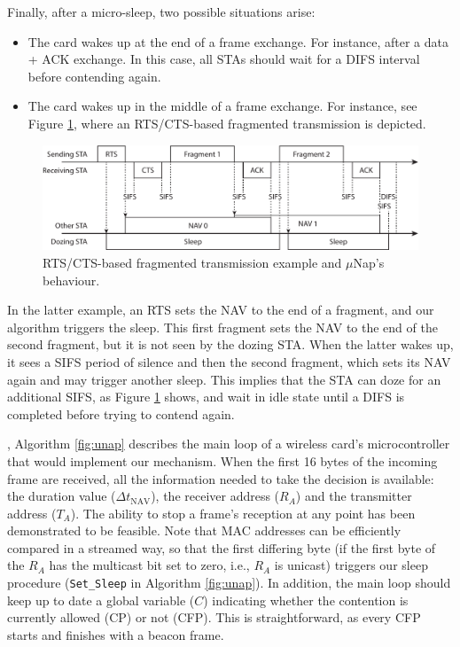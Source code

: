 \documentclass[twoside,nohyper]{tufte-book}
\providecommand{\tightlist}{%
  \setlength{\itemsep}{0pt}\setlength{\parskip}{0pt}}
\theoremstyle{definition}
\theoremstyle{definition}
\theoremstyle{definition}
\theoremstyle{remark}
\begin{document}
Finally, after a micro-sleep, two possible situations arise:

\begin{itemize}
\tightlist
\item
  The card wakes up at the end of a frame exchange. For instance, after
  a data + ACK exchange. In this case, all STAs should wait for a DIFS
  interval before contending again.
\item
  The card wakes up in the middle of a frame exchange. For instance, see
  Figure \ref{fig:fragments}, where an RTS/CTS-based fragmented
  transmission is depicted.
\end{itemize}




\begin{figure}

{\centering \includegraphics{img/05/fragments} 

}

\caption[RTS/CTS-based fragmented transmission example and
\(\mu\)Nap's behaviour.]{RTS/CTS-based fragmented transmission example and
\(\mu\)Nap's behaviour.}\label{fig:fragments}
\end{figure}

In the latter example, an RTS sets the NAV to the end of a fragment, and
our algorithm triggers the sleep. This first fragment sets the NAV to
the end of the second fragment, but it is not seen by the dozing STA.
When the latter wakes up, it sees a SIFS period of silence and then the
second fragment, which sets its NAV again and may trigger another sleep.
This implies that the STA can doze for an additional SIFS, as Figure
\ref{fig:fragments} shows, and wait in idle state until a DIFS is
completed before trying to contend again.

, Algorithm \ref{fig:unap} describes the
main loop of a wireless card's microcontroller that would implement our
mechanism. When the first 16 bytes of the incoming frame are received,
all the information needed to take the decision is available: the
duration value (\(\Delta t_\mathrm{NAV}\)), the receiver address
(\(R_A\)) and the transmitter address (\(T_A\)). The ability to stop a
frame's reception at any point has been demonstrated to be
feasible\cite[0pt]{berger2014}.
Note that MAC addresses can be efficiently compared in a streamed way,
so that the first differing byte (if the first byte of the \(R_A\) has
the multicast bit set to zero, i.e., \(R_A\) is unicast) triggers our
sleep procedure (\texttt{Set\_Sleep} in Algorithm \ref{fig:unap}). In
addition, the main loop should keep up to date a global variable (\(C\))
indicating whether the contention is currently allowed (CP) or not
(CFP). This is straightforward, as every CFP starts and finishes with a
beacon frame.
\end{document}
